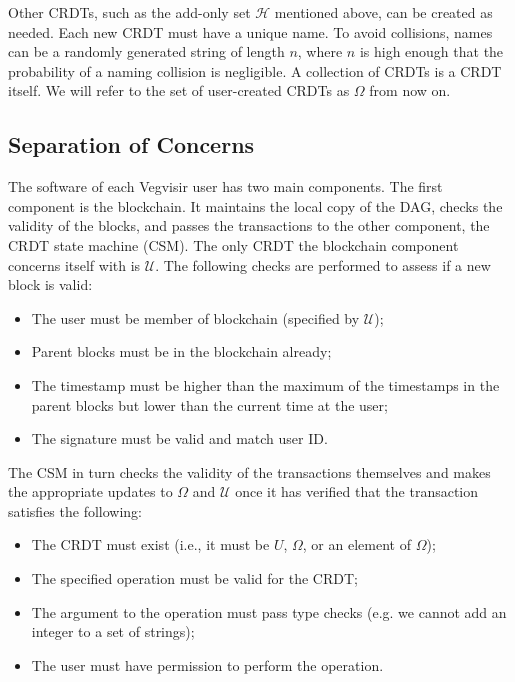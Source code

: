 \documentclass[conference, letterpaper]{IEEEtran}
\begin{document}
Other CRDTs, such as the add-only set $\mathcal{H}$ mentioned above, can be created as needed. Each new CRDT must have a unique name. To avoid collisions, names can be a randomly generated string of length $n$, where $n$ is high enough that the probability of a naming collision is negligible. A collection of CRDTs is a CRDT itself. We will refer to the set of user-created CRDTs as $\Omega$ from now on.

\subsection{Separation of Concerns}
The software of each Vegvisir user has two main components. The first component is the blockchain. It maintains the local copy of the DAG, checks the validity of the blocks, and passes the transactions to the other component, the CRDT state machine (CSM). The only CRDT the blockchain component concerns itself with is $\mathcal{U}$. The following checks are performed to assess if a new block is valid:
\begin{itemize}
\item The user must be member of blockchain (specified by $\mathcal{U}$);
\item Parent blocks must be in the blockchain already;
\item The timestamp must be higher than the maximum of the timestamps in the parent blocks but lower than the current time at the user;
\item The signature must be valid and match user ID.
\end{itemize}

The CSM in turn checks the validity of the transactions themselves and makes the appropriate updates to $\Omega$ and $\mathcal{U}$ once it has verified that the transaction satisfies the following:

\begin{itemize}
\item The CRDT must exist (i.e., it must be $U$, $\Omega$, or an element of $\Omega$);
\item The specified operation must be valid for the CRDT;
\item The argument to the operation must pass type checks (e.g. we cannot add an integer to a set of strings);
\item The user must have permission to perform the operation.
\end{itemize}
\end{document}
